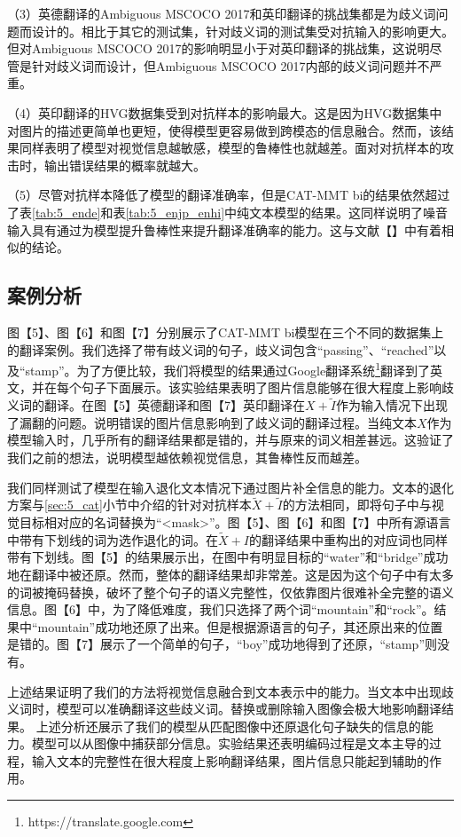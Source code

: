 （3）英德翻译的Ambiguous MSCOCO 2017和英印翻译的挑战集都是为歧义词问题而设计的。相比于其它的测试集，针对歧义词的测试集受对抗输入的影响更大。但对Ambiguous MSCOCO 2017的影响明显小于对英印翻译的挑战集，这说明尽管是针对歧义词而设计，但Ambiguous MSCOCO 2017内部的歧义词问题并不严重。

（4）英印翻译的HVG数据集受到对抗样本的影响最大。这是因为HVG数据集中对图片的描述更简单也更短，使得模型更容易做到跨模态的信息融合。然而，该结果同样表明了模型对视觉信息越敏感，模型的鲁棒性也就越差。面对对抗样本的攻击时，输出错误结果的概率就越大。

（5）尽管对抗样本降低了模型的翻译准确率，但是CAT-MMT bi的结果依然超过了表\ref{tab:5_ende}和表\ref{tab:5_enjp_enhi}中纯文本模型的结果。这同样说明了噪音输入具有通过为模型提升鲁棒性来提升翻译准确率的能力。这与文献【】中有着相似的结论。


\subsection{案例分析}
图【5】、图【6】和图【7】分别展示了CAT-MMT bi模型在三个不同的数据集上的翻译案例。我们选择了带有歧义词的句子，歧义词包含“passing”、“reached”以及“stamp”。为了方便比较，我们将模型的结果通过Google翻译系统\footnote{https://translate.google.com}翻译到了英文，并在每个句子下面展示。该实验结果表明了图片信息能够在很大程度上影响歧义词的翻译。在图【5】英德翻译和图【7】英印翻译在$X+\tilde{I}$作为输入情况下出现了漏翻的问题。说明错误的图片信息影响到了歧义词的翻译过程。当纯文本$X$作为模型输入时，几乎所有的翻译结果都是错的，并与原来的词义相差甚远。这验证了我们之前的想法，说明模型越依赖视觉信息，其鲁棒性反而越差。

我们同样测试了模型在输入退化文本情况下通过图片补全信息的能力。文本的退化方案与\ref{sec:5_cat}小节中介绍的针对对抗样本$\tilde{X}+\tilde{I}$的方法相同，即将句子中与视觉目标相对应的名词替换为“<mask>”。图【5】、图【6】和图【7】中所有源语言中带有下划线的词为选作退化的词。在$\tilde{X}+I$的翻译结果中重构出的对应词也同样带有下划线。图【5】的结果展示出，在图中有明显目标的“water”和“bridge”成功地在翻译中被还原。然而，整体的翻译结果却非常差。这是因为这个句子中有太多的词被掩码替换，破坏了整个句子的语义完整性，仅依靠图片很难补全完整的语义信息。图【6】中，为了降低难度，我们只选择了两个词“mountain”和“rock”。结果中“mountain”成功地还原了出来。但是根据源语言的句子，其还原出来的位置是错的。图【7】展示了一个简单的句子，“boy”成功地得到了还原，“stamp”则没有。

上述结果证明了我们的方法将视觉信息融合到文本表示中的能力。当文本中出现歧义词时，模型可以准确翻译这些歧义词。替换或删除输入图像会极大地影响翻译结果。
上述分析还展示了我们的模型从匹配图像中还原退化句子缺失的信息的能力。模型可以从图像中捕获部分信息。实验结果还表明编码过程是文本主导的过程，输入文本的完整性在很大程度上影响翻译结果，图片信息只能起到辅助的作用。